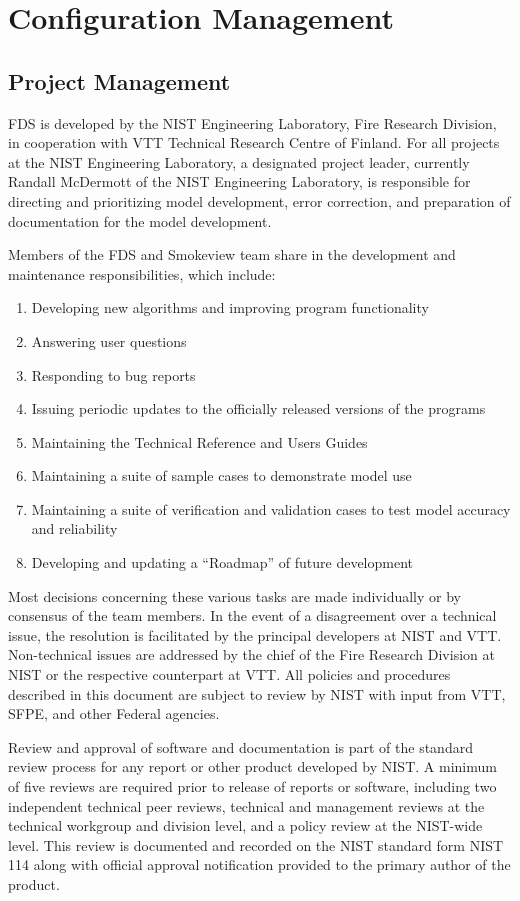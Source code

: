 \documentclass[11pt]{book}
\begin{document}
\chapter{Configuration Management}

\section{Project Management}

FDS is developed by the NIST Engineering Laboratory, Fire Research Division, in cooperation with VTT Technical Research Centre of Finland. For all projects at the NIST Engineering Laboratory, a designated project leader, currently Randall McDermott of the NIST Engineering Laboratory, is responsible for directing and prioritizing model development, error correction, and preparation of documentation for the model development.

Members of the FDS and Smokeview team share in the development and maintenance responsibilities, which include:
\begin{enumerate}
\item Developing new algorithms and improving program functionality
\item Answering user questions
\item Responding to bug reports
\item Issuing periodic updates to the officially released versions of the programs
\item Maintaining the Technical Reference and Users Guides
\item Maintaining a suite of sample cases to demonstrate model use
\item Maintaining a suite of verification and validation cases to test model accuracy and reliability
\item Developing and updating a ``Roadmap'' of future development
\end{enumerate}
Most decisions concerning these various tasks are made individually or by consensus of the team members. In the event of a disagreement over a technical issue, the resolution is facilitated by the principal developers at NIST and VTT. Non-technical issues are addressed by the chief of the Fire Research Division at NIST or the respective counterpart at VTT. All policies and procedures described in this document are subject to review by NIST with input from VTT, SFPE, and other Federal agencies.

Review and approval of software and documentation is part of the standard review process for any report or other product developed by NIST. A minimum of five reviews are required prior to release of reports or software, including two independent technical peer reviews, technical and management reviews at the technical workgroup and division level, and a policy review at the NIST-wide level.  This review is documented and recorded on the NIST standard form NIST 114 along with official approval notification provided to the primary author of the product.
\end{document}
